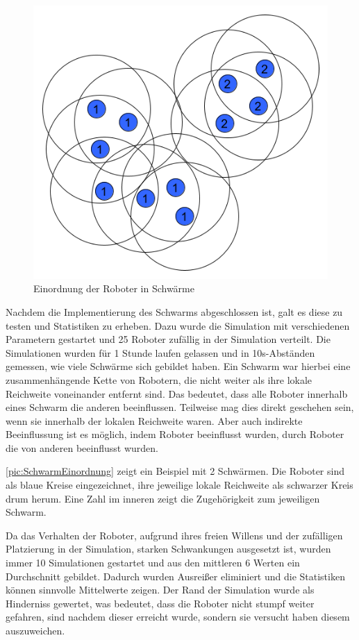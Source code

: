 \begin{figure}
	\includegraphics[width=\pictureWidth,keepaspectratio]{graphics/SchwarmEinordnung.png}
	\caption{Einordnung der Roboter in Schwärme}
	\label{pic:SchwarmEinordnung}
\end{figure}

Nachdem die Implementierung des Schwarms abgeschlossen ist, galt es diese zu testen und Statistiken zu erheben. Dazu wurde die Simulation mit verschiedenen Parametern gestartet und 25 Roboter zufällig in der Simulation verteilt. Die Simulationen wurden für 1 Stunde laufen gelassen und in 10s-Abständen gemessen, wie viele Schwärme sich gebildet haben.
Ein Schwarm war hierbei eine zusammenhängende Kette von Robotern, die nicht weiter als ihre lokale Reichweite voneinander entfernt sind. Das bedeutet, dass alle Roboter innerhalb eines Schwarm die anderen beeinflussen. Teilweise mag dies direkt geschehen sein, wenn sie innerhalb der lokalen Reichweite waren. Aber auch indirekte Beeinflussung ist es möglich, indem Roboter beeinflusst wurden, durch Roboter die von anderen beeinflusst wurden.

\autoref{pic:SchwarmEinordnung} zeigt ein Beispiel mit 2 Schwärmen. Die Roboter sind als blaue Kreise eingezeichnet, ihre jeweilige lokale Reichweite als schwarzer Kreis drum herum. Eine Zahl im inneren zeigt die Zugehörigkeit zum jeweiligen Schwarm.

Da das Verhalten der Roboter, aufgrund ihres freien Willens und der zufälligen Platzierung in der Simulation, starken Schwankungen ausgesetzt ist, wurden immer 10 Simulationen gestartet und aus den mittleren 6 Werten ein Durchschnitt gebildet. Dadurch wurden Ausreißer eliminiert und die Statistiken können sinnvolle Mittelwerte zeigen. Der Rand der Simulation wurde als Hinderniss gewertet, was bedeutet, dass die Roboter nicht stumpf weiter gefahren, sind nachdem dieser erreicht wurde, sondern sie versucht haben diesem auszuweichen.

